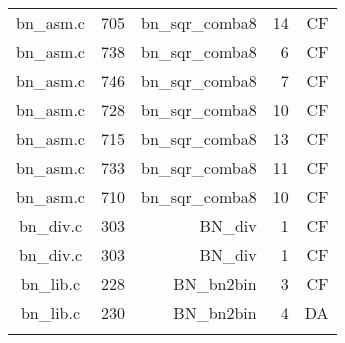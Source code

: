 \begin{table}[h]
{\begin{tabular}{clrrr}
bn\_asm.c&705&bn\_sqr\_comba8&14&CF\\
bn\_asm.c&738&bn\_sqr\_comba8&6 &CF\\
bn\_asm.c&746&bn\_sqr\_comba8&7 &CF\\
bn\_asm.c&728&bn\_sqr\_comba8&10&CF\\
bn\_asm.c&715&bn\_sqr\_comba8&13&CF\\
bn\_asm.c&733&bn\_sqr\_comba8&11&CF\\
bn\_asm.c&710&bn\_sqr\_comba8&10&CF\\
bn\_div.c&303&BN\_div&1 &CF\\
bn\_div.c&303&BN\_div&1 &CF\\
bn\_lib.c&228&BN\_bn2bin&3 &CF\\
bn\_lib.c&230&BN\_bn2bin&4 &DA\\
&&&&\\
\hline
\end{tabular}
}
\end{table}
